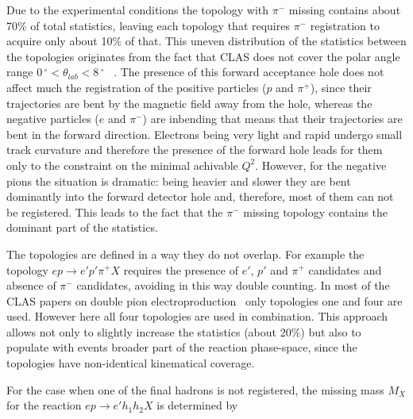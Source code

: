 \documentclass[prc,twocolumn,superscriptaddress,showpacs,amssymb,amsmath,amsfonts,linenumbers,aps]{revtex4-1}
\begin{document}
Due to the experimental conditions the topology with $\pi^{-}$ missing contains about 70\% of total statistics, leaving each topology that requires $\pi^{-}$ registration to acquire only about 10\% of that. This uneven distribution of the statistics between the topologies originates from the fact that CLAS does not cover the polar angle range $0\,^{\circ}\mathrm{} < \theta_{lab} < 8\,^{\circ}\mathrm{}$ ~\cite{Me03}. 
The presence of this forward acceptance hole does not affect much the registration of the positive particles ($p$ and $\pi^{+}$), since their trajectories are bent by the magnetic field away from the hole, whereas the negative particles ($e$ and $\pi^{-}$) are inbending that means that their trajectories are bent in the forward direction. Electrons being very light and rapid undergo small track curvature and therefore the presence of the forward hole leads for them only to
the constraint on the minimal achivable $Q^2$. However, for the negative pions the situation is dramatic: being heavier and slower they are bent dominantly into the forward detector hole and, therefore, most of them can not be registered. This leads to the fact that the $\pi^{-}$ missing topology contains the dominant part of the statistics.


The topologies are defined in a way they do not overlap. For example the topology $e p \rightarrow e' p' \pi^{+} X$ requires the presence of $e'$, $p'$ and $\pi^{+}$ candidates and absence of $\pi^{-}$ candidates, avoiding in this way double counting. In most of the CLAS papers on double pion electroproduction~\cite{Isupov:2017lnd,Ripani:2002ss,Fedotov:2008aa} only topologies one and four are used. However here all four topologies are used in combination. 
This approach allows not only to slightly increase the statistics (about 20\%) but also to populate with events broader part of the reaction phase-space, since the topologies have non-identical kinematical coverage. 








For the case when one of the final hadrons is not registered, the missing mass $M_{X}$ for the reaction $e p \rightarrow e' h_1 h_2 X$ is determined by 
\end{document}
